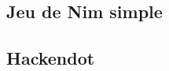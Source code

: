 \subsection{Jeu de Nim simple}
\label{sub:Jeu de Nim simple}
    
\subsection{Hackendot}
\label{sub:Hackendot}